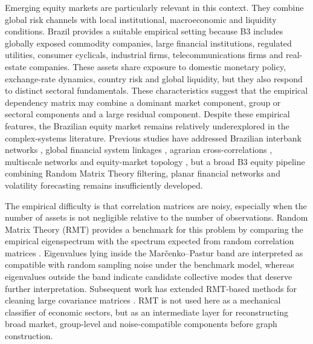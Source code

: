 Emerging equity markets are particularly relevant in this context. They combine global risk channels with local institutional, macroeconomic and liquidity conditions. Brazil provides a suitable empirical setting because B3 includes globally exposed commodity companies, large financial institutions, regulated utilities, consumer cyclicals, industrial firms, telecommunications firms and real-estate companies. These assets share exposure to domestic monetary policy, exchange-rate dynamics, country risk and global liquidity, but they also respond to distinct sectoral fundamentals. These characteristics suggest that the empirical dependency matrix may combine a dominant market component, group or sectoral components and a large residual component. Despite these empirical features, the Brazilian equity market remains relatively underexplored in the complex-systems literature. Previous studies have addressed Brazilian interbank networks \cite{tabak_2010_topology}, global financial system linkages \cite{silva_2016_structure}, agrarian cross-correlations \cite{stosic_2015_correlations}, multiscale networks \cite{pereira_2019_multiscale} and equity-market topology \cite{leonel_2022_brazilian}, but a broad B3 equity pipeline combining Random Matrix Theory filtering, planar financial networks and volatility forecasting remains insufficiently developed.

The empirical difficulty is that correlation matrices are noisy, especially when the number of assets is not negligible relative to the number of observations. Random Matrix Theory (RMT) provides a benchmark for this problem by comparing the empirical eigenspectrum with the spectrum expected from random correlation matrices \cite{marcenko_1967_distribution,laloux_1999_noise,plerou_2002_random}. Eigenvalues lying inside the Mar\v{c}enko--Pastur band are interpreted as compatible with random sampling noise under the benchmark model, whereas eigenvalues outside the band indicate candidate collective modes that deserve further interpretation. Subsequent work has extended RMT-based methods for cleaning large covariance matrices \cite{bun_2017_cleaning}. RMT is not used here as a mechanical classifier of economic sectors, but as an intermediate layer for reconstructing broad market, group-level and noise-compatible components before graph construction.

